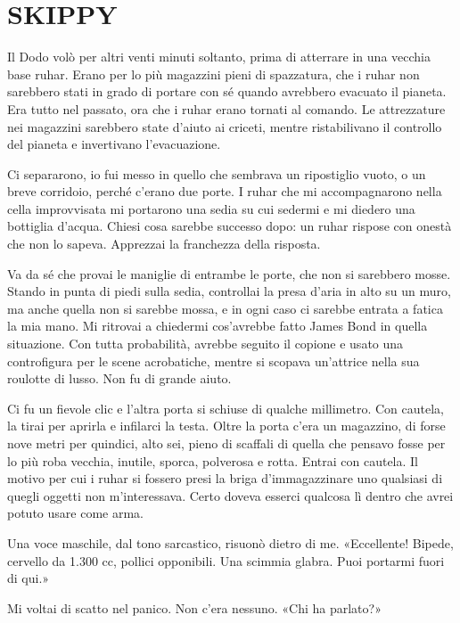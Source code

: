 \chapter{SKIPPY}\label{skippy}

\hfill\break

Il Dodo volò per altri venti minuti soltanto, prima di atterrare in una
vecchia base ruhar. Erano per lo più magazzini pieni di spazzatura, che
i ruhar non sarebbero stati in grado di portare con sé quando avrebbero
evacuato il pianeta. Era tutto nel passato, ora che i ruhar erano
tornati al comando. Le attrezzature nei magazzini sarebbero state
d'aiuto ai criceti, mentre ristabilivano il controllo del pianeta e
invertivano l'evacuazione.

Ci separarono, io fui messo in quello che sembrava un ripostiglio vuoto,
o un breve corridoio, perché c'erano due porte. I ruhar che mi
accompagnarono nella cella improvvisata mi portarono una sedia su cui
sedermi e mi diedero una bottiglia d'acqua. Chiesi cosa sarebbe successo
dopo: un ruhar rispose con onestà che non lo sapeva. Apprezzai la
franchezza della risposta.

Va da sé che provai le maniglie di entrambe le porte, che non si
sarebbero mosse. Stando in punta di piedi sulla sedia, controllai la
presa d'aria in alto su un muro, ma anche quella non si sarebbe mossa, e
in ogni caso ci sarebbe entrata a fatica la mia mano. Mi ritrovai a
chiedermi cos'avrebbe fatto James Bond in quella situazione. Con tutta
probabilità, avrebbe seguito il copione e usato una controfigura per le
scene acrobatiche, mentre si scopava un'attrice nella sua roulotte di
lusso. Non fu di grande aiuto.

Ci fu un fievole clic e l'altra porta si schiuse di qualche millimetro.
Con cautela, la tirai per aprirla e infilarci la testa. Oltre la porta
c'era un magazzino, di forse nove metri per quindici, alto sei, pieno di
scaffali di quella che pensavo fosse per lo più roba vecchia, inutile,
sporca, polverosa e rotta. Entrai con cautela. Il motivo per cui i ruhar
si fossero presi la briga d'immagazzinare uno qualsiasi di quegli
oggetti non m'interessava. Certo doveva esserci qualcosa lì dentro che
avrei potuto usare come arma.

Una voce maschile, dal tono sarcastico, risuonò dietro di me.
«Eccellente! Bipede, cervello da 1.300 cc, pollici opponibili. Una
scimmia glabra. Puoi portarmi fuori di qui.»

Mi voltai di scatto nel panico. Non c'era nessuno. «Chi ha parlato?»

